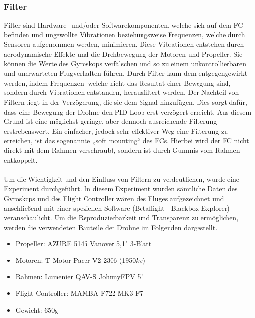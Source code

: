         \subsubsection[Filter]{Filter}
        Filter sind Hardware- und/oder Softwarekomponenten, welche sich auf dem FC befinden und
        ungewollte Vibrationen beziehungsweise Frequenzen, welche durch Sensoren aufgenommen werden,
        minimieren. Diese Vibrationen entstehen durch aerodynamische Effekte und die Drehbewegung
        der Motoren und Propeller. Sie können die Werte des Gyroskops verfälschen und so zu einem
        unkontrollierbaren und unerwarteten Flugverhalten führen. Durch Filter kann dem entgegengewirkt
        werden, indem Frequenzen, welche nicht das Resultat einer Bewegung sind, sondern durch Vibrationen
        entstanden, herausfiltert werden. Der Nachteil von Filtern liegt in der Verzögerung, die sie
        dem Signal hinzufügen.
        \newpage
        Dies sorgt dafür, dass eine Bewegung der Drohne den PID-Loop erst verzögert
        erreicht. Aus diesem Grund ist eine möglichst geringe, aber dennoch ausreichende Filterung
        erstrebenswert. Ein einfacher, jedoch sehr effektiver Weg eine Filterung zu erreichen, ist das
        sogenannte „soft mounting“ des FCs. Hierbei wird der FC nicht direkt mit dem Rahmen verschraubt,
        sondern ist durch Gummis vom Rahmen entkoppelt. \\
        \\
        Um die Wichtigkeit und den Einfluss von Filtern zu verdeutlichen, wurde eine Experiment durchgeführt.
        In diesem Experiment wurden sämtliche Daten des Gyroskops und des Flight Controller wären des Fluges
        aufgezeichnet und anschließend mit einer speziellen Software (Betaflight - Blackbox Explorer)
        veranschaulicht. Um die Reproduzierbarkeit und Transparenz zu ermöglichen, werden die verwendeten
        Bauteile der Drohne im Folgenden dargestellt. \\

        \begin{itemize}
            \item[] Propeller: AZURE 5145 Vanover 5,1" 3-Blatt
            \item[] Motoren: T Motor Pacer V2 2306 (1950$kv$)
            \item[] Rahmen: Lumenier QAV-S JohnnyFPV 5"
            \item[] Flight Controller: MAMBA F722 MK3 F7
            \item[] Gewicht: 650g
        \end{itemize}
        \vspace{0.5cm}

